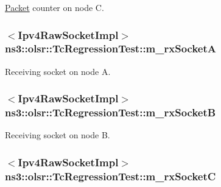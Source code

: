 \hyperlink{classns3_1_1Packet}{Packet} counter on node C. 

\subsubsection[{\texorpdfstring{m\+\_\+rx\+SocketA}{m_rxSocketA}}]{$<${\bf Ipv4\+Raw\+Socket\+Impl}$>$ ns3\+::olsr\+::\+Tc\+Regression\+Test\+::m\+\_\+rx\+SocketA\hspace{0.3cm}{\ttfamily [private]}}\hypertarget{classns3_1_1olsr_1_1TcRegressionTest_accd5e6cfdc334e18e2aa762c34933d65}{}\label{classns3_1_1olsr_1_1TcRegressionTest_accd5e6cfdc334e18e2aa762c34933d65}


Receiving socket on node A. 

\subsubsection[{\texorpdfstring{m\+\_\+rx\+SocketB}{m_rxSocketB}}]{$<${\bf Ipv4\+Raw\+Socket\+Impl}$>$ ns3\+::olsr\+::\+Tc\+Regression\+Test\+::m\+\_\+rx\+SocketB\hspace{0.3cm}{\ttfamily [private]}}\hypertarget{classns3_1_1olsr_1_1TcRegressionTest_a613e960a6c03b010469285bed546926a}{}\label{classns3_1_1olsr_1_1TcRegressionTest_a613e960a6c03b010469285bed546926a}


Receiving socket on node B. 

\subsubsection[{\texorpdfstring{m\+\_\+rx\+SocketC}{m_rxSocketC}}]{$<${\bf Ipv4\+Raw\+Socket\+Impl}$>$ ns3\+::olsr\+::\+Tc\+Regression\+Test\+::m\+\_\+rx\+SocketC\hspace{0.3cm}{\ttfamily [private]}}\hypertarget{classns3_1_1olsr_1_1TcRegressionTest_a975ca6a79376d46d9bd30990e54dd79c}{}\label{classns3_1_1olsr_1_1TcRegressionTest_a975ca6a79376d46d9bd30990e54dd79c}


